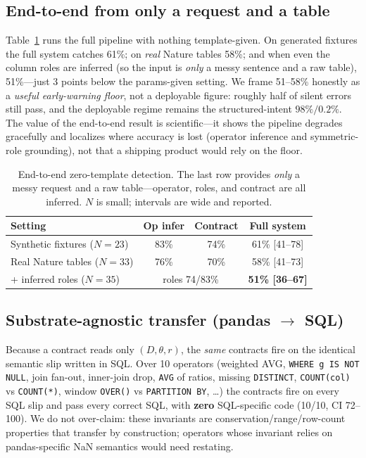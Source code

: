 \documentclass[10pt,twocolumn,letterpaper]{article}
\begin{document}
\subsection{End-to-end from only a request and a table}\label{sec:e2e}
Table~\ref{tab:e2e} runs the full pipeline with nothing template-given. On
generated fixtures the full system catches 61\%; on \emph{real} Nature tables
58\%; and when even the column roles are inferred (so the input is \emph{only} a
messy sentence and a raw table), 51\%---just 3 points below the params-given
setting. We frame 51--58\% honestly as a \emph{useful early-warning floor}, not
a deployable figure: roughly half of silent errors still pass, and the
deployable regime remains the structured-intent $98\%/0.2\%$. The value of the
end-to-end result is scientific---it shows the pipeline degrades gracefully and
localizes where accuracy is lost (operator inference and symmetric-role
grounding), not that a shipping product would rely on the floor.

\begin{table}[t]\centering\small
\setlength{\tabcolsep}{4pt}
\begin{tabular}{@{}lccc@{}}
\toprule
Setting & Op infer & Contract & Full system\\
\midrule
Synthetic fixtures ($N{=}23$) & 83\% & 74\% & 61\% [41--78]\\
Real Nature tables ($N{=}33$) & 76\% & 70\% & 58\% [41--73]\\
\;+ inferred roles ($N{=}35$) & \multicolumn{2}{c}{roles 74/83\%} & \textbf{51\% [36--67]}\\
\bottomrule
\end{tabular}
\caption{End-to-end zero-template detection. The last row provides \emph{only} a
messy request and a raw table---operator, roles, and contract are all inferred.
$N$ is small; intervals are wide and reported.}
\label{tab:e2e}
\end{table}

\subsection{Substrate-agnostic transfer (pandas $\to$ SQL)}\label{sec:sql}
Because a contract reads only $(D,\theta,r)$, the \emph{same} contracts fire on
the identical semantic slip written in SQL. Over 10 operators (weighted AVG,
\texttt{WHERE g IS NOT NULL}, join fan-out, inner-join drop, \texttt{AVG} of
ratios, missing \texttt{DISTINCT}, \texttt{COUNT(col)} vs \texttt{COUNT(*)},
window \texttt{OVER()} vs \texttt{PARTITION BY}, \dots) the contracts fire on
every SQL slip and pass every correct SQL, with \textbf{zero} SQL-specific code
(10/10, CI 72--100). We do not over-claim: these invariants are
conservation/range/row-count properties that transfer by construction; operators
whose invariant relies on pandas-specific NaN semantics would need restating.
\end{document}
